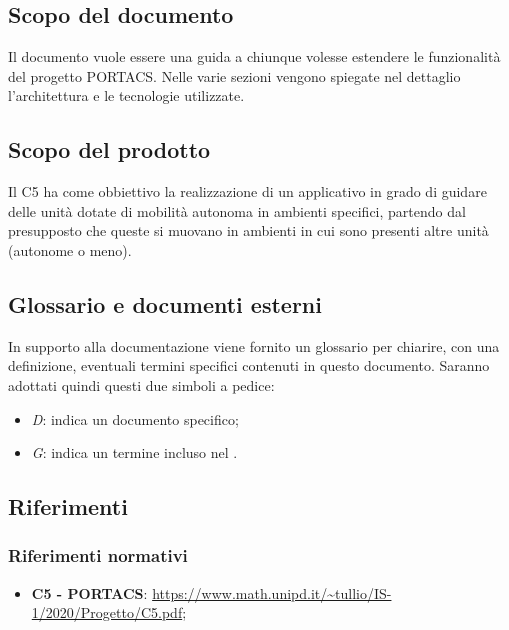 \subsection{Scopo del documento}
	Il documento vuole essere una guida a chiunque volesse estendere le funzionalità del progetto PORTACS. Nelle varie sezioni vengono spiegate nel dettaglio l'architettura e le tecnologie utilizzate.

\subsection{Scopo del prodotto}
	Il  C5 ha come obbiettivo la realizzazione di un applicativo  in grado di guidare delle unità dotate di mobilità autonoma in ambienti specifici, partendo dal presupposto che queste si muovano in ambienti in cui sono presenti altre unità (autonome o meno).

\subsection{Glossario e documenti esterni}
	In supporto alla documentazione viene fornito un glossario per chiarire, con una definizione, eventuali termini specifici contenuti in questo documento.
	Saranno adottati quindi questi due simboli a pedice:
	\begin{itemize}
		\item \textit{D}: indica un documento specifico;
		\item \textit{G}: indica un termine incluso nel .
	\end{itemize}

\subsection{Riferimenti}
	\subsubsection{Riferimenti normativi}
	\begin{itemize}
		\item \textbf{{ C5 - PORTACS}}: \url{https://www.math.unipd.it/~tullio/IS-1/2020/Progetto/C5.pdf};
	\end{itemize}
